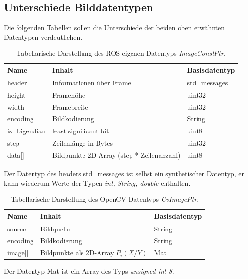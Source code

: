 		\subsection{Unterschiede Bilddatentypen}
		Die folgenden Tabellen sollen die Unterschiede der beiden oben erwähnten Datentypen verdeutlichen.
\begin{table}[H]
\begin{tabular}{|l|l|l|}
\hline \rule[-2ex]{0pt}{5.5ex} Name & Inhalt & Basisdatentyp \\ 
\hline \rule[-2ex]{0pt}{5.5ex} header & Informationen über Frame & std\_messages \\ 
\hline \rule[-2ex]{0pt}{5.5ex} height & Framehöhe & uint32\\ 
\hline \rule[-2ex]{0pt}{5.5ex} width & Framebreite & uint32\\  
\hline \rule[-2ex]{0pt}{5.5ex} encoding & Bildkodierung & String\\  
\hline \rule[-2ex]{0pt}{5.5ex} is\_bigendian & least significant bit & uint8\\ 
\hline \rule[-2ex]{0pt}{5.5ex} step & Zeilenlänge in Bytes & uint32\\ 
\hline \rule[-2ex]{0pt}{5.5ex} data[] & Bildpunkte 2D-Array (step * Zeilenanzahl) & uint8\\ 
\hline
\end{tabular}
\caption{Tabellarische Darstellung des ROS eigenen Datentyps \textit{ImageConstPtr}.} 
\end{table}
Der Datentyp des headers std\_messages ist selbst ein synthetischer Datentyp, er kann wiederum Werte der Typen \textit{int, String, double} enthalten.
\begin{table}[H]
\begin{tabular}{|l|l|l|}
\hline Name & Inhalt & Basisdatentyp\\ 
\hline source & Bildquelle & String\\
\hline encoding & Bildkodierung & String\\
\hline image[] & Bildpunkte als 2D-Array $P_i(X/Y)$ & Mat\\
\hline
\end{tabular}
\caption{Tabellarische Darstellung des OpenCV Datentyps \textit{CvImagePtr}.}
\end{table}
Der Datentyp Mat ist ein Array des Typs \textit{unsigned int 8}.
 				 
		
